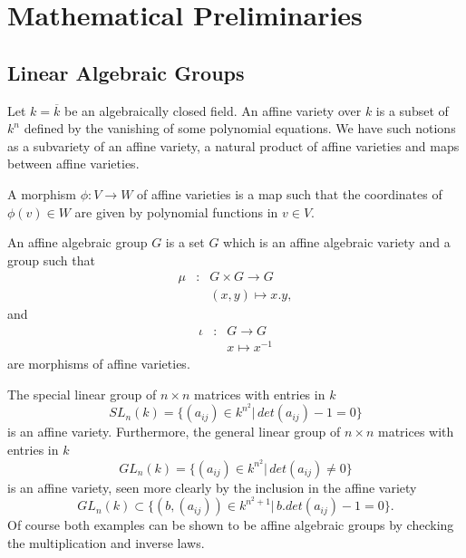 
\chapter{Mathematical Preliminaries}
\label{Chapter2}

\section{Linear Algebraic Groups}
Let $k = \overline{k}$ be an algebraically closed field. An affine variety over $k$ is a subset of $k^n$ defined by the vanishing of some polynomial equations. We have such notions as a subvariety of an affine variety, a natural product of affine varieties and maps between affine varieties.

A morphism $\phi:V \rightarrow W$ of affine varieties is a map such that the coordinates of $\phi(v) \in W$ are given by polynomial functions in $v \in V$.

An affine algebraic group $G$ is a set $G$ which is an affine algebraic variety and a group such that
\begin{eqnarray*}
	\mu&:& G \times G \rightarrow G\\
	&&(x,y) \mapsto x.y,
\end{eqnarray*}
and
\begin{eqnarray*}
	\iota&:& G \rightarrow G \\
	&&x \mapsto x^{-1}
\end{eqnarray*}
are morphisms of affine varieties.

\begin{example}
	The special linear group of $n\times n$ matrices with entries in $k$
	\begin{displaymath}
		SL_n(k) = \{(a_{ij}) \in k^{n^2} |\, det(a_{ij}) - 1 = 0\}
	\end{displaymath}
	is an affine variety. Furthermore, the general linear group of $n\times n$ matrices with entries in $k$
	\begin{displaymath}
		GL_n(k) = \{(a_{ij}) \in k^{n^2} |\, det(a_{ij}) \neq 0\}
	\end{displaymath}
	is an affine variety, seen more clearly by the inclusion in the affine variety
	\begin{displaymath}
		GL_n(k)\subset \{(b, (a_{ij})) \in k^{n^2 + 1} |\, b.det(a_{ij}) - 1 = 0\}.
	\end{displaymath}
	Of course both examples can be shown to be affine algebraic groups by checking the multiplication and inverse laws.
\end{example}

